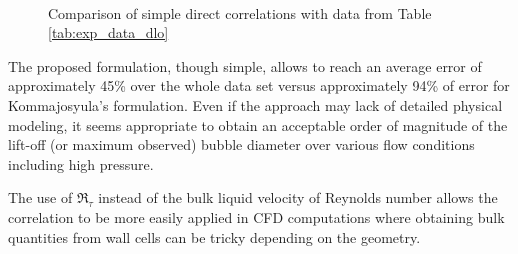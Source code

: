 \begin{figure}[!h]
\centering
{}
\\
\caption{Comparison of simple direct correlations with data from Table \ref{tab:exp_data_dlo}}
\label{fig:performance_correl_dlo}
\end{figure}

The proposed formulation, though simple, allows to reach an average error of approximately 45\% over the whole data set versus approximately 94\% of error for Kommajosyula's formulation. Even if the approach may lack of detailed physical modeling, it seems appropriate to obtain an acceptable order of magnitude of the lift-off (or maximum observed) bubble diameter over various flow conditions including high pressure. 

\begin{remark*}{}
The use of $\Re_{\tau}$ instead of the bulk liquid velocity of Reynolds number allows the correlation to be more easily applied in CFD computations where obtaining bulk quantities from wall cells can be tricky depending on the geometry.
\end{remark*}


